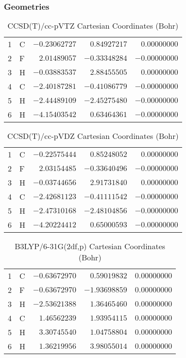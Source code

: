 \documentclass[10pt,oneside]{article}
\begin{document}
\clearpage

\subsection{\ \ \ }

\subsubsection*{Geometries}
\begin{table}[h!]
\centering
\caption{CCSD(T)/cc-pVTZ Cartesian Coordinates (Bohr)}
\begin{tabular}{llrrr}
1  & C  & $-0.23062727$ & $ 0.84927217$ & $ 0.00000000$ \\
2  & F  & $ 2.01489057$ & $-0.33348284$ & $-0.00000000$ \\
3  & H  & $-0.03883537$ & $ 2.88455505$ & $ 0.00000000$ \\
4  & C  & $-2.40187281$ & $-0.41086779$ & $-0.00000000$ \\
5  & H  & $-2.44489109$ & $-2.45275480$ & $-0.00000000$ \\
6  & H  & $-4.15403542$ & $ 0.63464361$ & $-0.00000000$ \\
\end{tabular}
\end{table}

\begin{table}[h!]
\centering
\caption{CCSD(T)/cc-pVDZ Cartesian Coordinates (Bohr)}
\begin{tabular}{llrrr}
1  & C  & $-0.22575444$ & $ 0.85248052$ & $ 0.00000000$ \\
2  & F  & $ 2.03154485$ & $-0.33640496$ & $-0.00000000$ \\
3  & H  & $-0.03744656$ & $ 2.91731840$ & $ 0.00000000$ \\
4  & C  & $-2.42681123$ & $-0.41111542$ & $-0.00000000$ \\
5  & H  & $-2.47310168$ & $-2.48104856$ & $-0.00000000$ \\
6  & H  & $-4.20224412$ & $ 0.65000593$ & $-0.00000000$ \\
\end{tabular}
\end{table}

\begin{table}[h!]
\centering
\caption{B3LYP/6-31G(2df,p) Cartesian Coordinates (Bohr)}
\begin{tabular}{llrrr}
1  & C  & $-0.63672970$ & $ 0.59019832$ & $ 0.00000000$ \\
2  & F  & $-0.63672970$ & $-1.93698859$ & $ 0.00000000$ \\
3  & H  & $-2.53621388$ & $ 1.36465460$ & $ 0.00000000$ \\
4  & C  & $ 1.46562239$ & $ 1.93954115$ & $ 0.00000000$ \\
5  & H  & $ 3.30745540$ & $ 1.04758804$ & $ 0.00000000$ \\
6  & H  & $ 1.36219956$ & $ 3.98055014$ & $ 0.00000000$ \\
\end{tabular}
\end{table}
\end{document}
